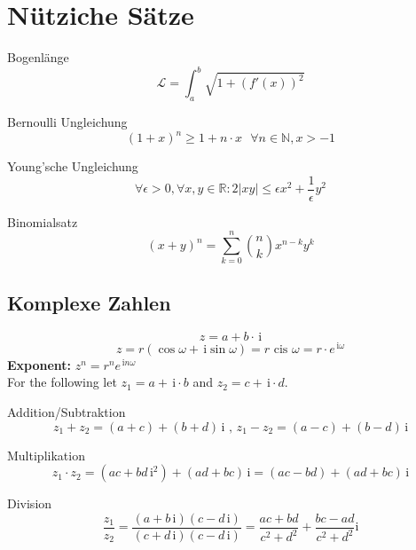 \documentclass[a4paper,8pt]{extarticle}
\def\R{\mathbb{R}}
\begin{document}
\section{Nütziche Sätze}

\begin{subbox}{Bogenlänge}
  $$\mathcal{L} = \int_a^b \sqrt{1 + (f'(x))^2}$$ 
\end{subbox}

\begin{subbox}{Bernoulli Ungleichung}
  $$(1 + x)^n \geq 1 + n \cdot x \ \ \ \forall n \in \mathbb{N}, x > -1$$
\end{subbox}

\begin{subbox}{Young'sche Ungleichung}
  $$\forall \epsilon > 0, \forall x, y \in \R: 2|xy| \leq \epsilon x^2 + \frac{1}{\epsilon} y^2$$
\end{subbox}

\begin{subbox}{Binomialsatz}
  $$(x + y)^n = \sum_{k = 0}^n {n \choose k} x^{n-k}y^k$$
\end{subbox}

\subsection{Komplexe Zahlen}
  $$z = a + b \cdot \,\mathrm i$$
  $$z = r(\cos \omega + \,\mathrm i \sin \omega) = r \text{ cis } \omega = r\cdot e^{\,\mathrm i \omega}$$
  \textbf{Exponent:} $z^n = r^ne^{\,\mathrm i n \omega}$ \\
  For the following let $z_1 = a + \,\mathrm i\cdot b$ and $z_2 = c + \,\mathrm i \cdot d$. 
  \begin{subbox}{Addition/Subtraktion}
    $$z_1+z_2=(a+c)+(b+d)\,\mathrm i \text{   ,   } z_1-z_2=(a-c)+(b-d)\,\mathrm i$$
  \end{subbox}

  \begin{subbox}{Multiplikation}
    $$z_1\cdot z_2=(ac+bd\,\mathrm i^2)+(ad+bc)\,\mathrm i=(ac-bd)+(ad+bc)\,\mathrm i$$
  \end{subbox}

  \begin{subbox}{Division}
    $$\frac{z_1}{z_2} = \frac{(a+b\,\mathrm i)(c-d\,\mathrm i)}{(c+d\,\mathrm i)(c-d\,\mathrm i)} = \frac{ac+bd}{c^2+d^2}+\frac{bc-ad}{c^2+d^2}\mathrm i$$
  \end{subbox}
\end{document}
